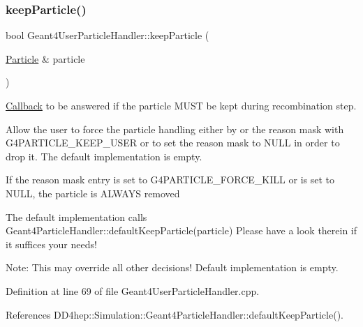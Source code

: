 \hypertarget{class_d_d4hep_1_1_simulation_1_1_geant4_user_particle_handler_a34cc6206492754adfea2f007313512dc}{}\label{class_d_d4hep_1_1_simulation_1_1_geant4_user_particle_handler_a34cc6206492754adfea2f007313512dc} 
\subsubsection{\texorpdfstring{keep\+Particle()}{keepParticle()}}
{\footnotesize\ttfamily bool Geant4\+User\+Particle\+Handler\+::keep\+Particle (\begin{DoxyParamCaption}\item[{\hyperlink{class_d_d4hep_1_1_simulation_1_1_geant4_user_particle_handler_a0222f326d539ff27c6c446a7a30e8e26}{Particle} \&}]{particle }\end{DoxyParamCaption})\hspace{0.3cm}{\ttfamily [virtual]}}



\hyperlink{class_d_d4hep_1_1_callback}{Callback} to be answered if the particle M\+U\+ST be kept during recombination step. 

Allow the user to force the particle handling either by or the reason mask with G4\+P\+A\+R\+T\+I\+C\+L\+E\+\_\+\+K\+E\+E\+P\+\_\+\+U\+S\+ER or to set the reason mask to N\+U\+LL in order to drop it. The default implementation is empty.

If the reason mask entry is set to G4\+P\+A\+R\+T\+I\+C\+L\+E\+\_\+\+F\+O\+R\+C\+E\+\_\+\+K\+I\+LL or is set to N\+U\+LL, the particle is A\+L\+W\+A\+YS removed

The default implementation calls Geant4\+Particle\+Handler\+::default\+Keep\+Particle(particle) Please have a look therein if it suffices your needs!

Note\+: This may override all other decisions! Default implementation is empty. 

Definition at line 69 of file Geant4\+User\+Particle\+Handler.\+cpp.



References D\+D4hep\+::\+Simulation\+::\+Geant4\+Particle\+Handler\+::default\+Keep\+Particle().



